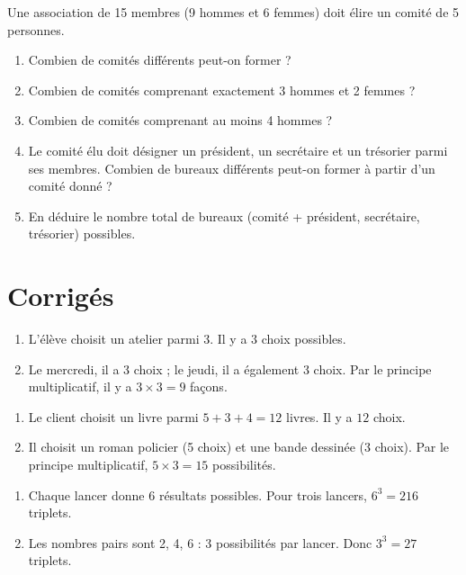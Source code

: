 Une association de 15 membres (9 hommes et 6 femmes) doit élire un comité de 5 personnes.
\begin{enumerate}[label=\arabic*)]
    \item Combien de comités différents peut-on former ?
    \item Combien de comités comprenant exactement 3 hommes et 2 femmes ?
    \item Combien de comités comprenant au moins 4 hommes ?
    \item Le comité élu doit désigner un président, un secrétaire et un trésorier parmi ses membres. Combien de bureaux différents peut-on former à partir d'un comité donné ?
    \item En déduire le nombre total de bureaux (comité + président, secrétaire, trésorier) possibles.
\end{enumerate}

\section{Corrigés}

\begin{enumerate}[label=\alph*)]
    \item L'élève choisit un atelier parmi 3. Il y a $3$ choix possibles.
    \item Le mercredi, il a 3 choix ; le jeudi, il a également 3 choix. Par le principe multiplicatif, il y a $3 \times 3 = 9$ façons.
\end{enumerate}

\begin{enumerate}[label=\alph*)]
    \item Le client choisit un livre parmi $5+3+4=12$ livres. Il y a $12$ choix.
    \item Il choisit un roman policier (5 choix) et une bande dessinée (3 choix). Par le principe multiplicatif, $5 \times 3 = 15$ possibilités.
\end{enumerate}

\begin{enumerate}[label=\alph*)]
    \item Chaque lancer donne 6 résultats possibles. Pour trois lancers, $6^3 = 216$ triplets.
    \item Les nombres pairs sont 2, 4, 6 : 3 possibilités par lancer. Donc $3^3 = 27$ triplets.
\end{enumerate}

